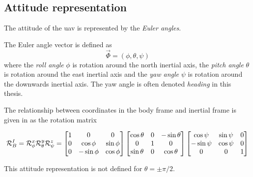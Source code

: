 \subsection{Attitude representation}
The attitude of the \ac{uav} is represented by the \textit{Euler angles}. 

\begin{definition}
The Euler angle vector is defined as
\begin{equation}
    \vec{\Phi}=(\phi, \theta, \psi)
\end{equation}
where the \textit{roll angle} $\phi$ is rotation around the north inertial axis, 
the \textit{pitch angle} $\theta$ is rotation around the east inertial axis and
the \textit{yaw angle} $\psi$ is rotation around the downwards inertial axis. The yaw angle is often 
denoted \textit{heading} in this thesis.

The relationship between coordinates in the body frame and inertial frame is given
in \cite{sensor_fusion} as the rotation matrix 

\begin{equation}\label{eq:r_i_b}
\mathcal{R}^I_B = \mathcal{R}^x_\phi\mathcal{R}^y_\theta\mathcal{R}^z_\psi\\
=
\begin{bmatrix}
    1 & 0 & 0 \\
    0 & \cos\phi & \sin\phi \\
    0 & -\sin\phi & \cos\phi
\end{bmatrix}
\begin{bmatrix}
    \cos\theta & 0 & -\sin\theta \\
    0 & 1 & 0 \\
    \sin\theta & 0 & \cos\theta
\end{bmatrix}      
\begin{bmatrix}
    \cos\psi & \sin\psi & 0 \\
    -\sin\psi & \cos\psi & 0 \\
    0 & 0 & 1
\end{bmatrix}
\end{equation}  
\end{definition}

This attitude representation is not defined for $\theta=\pm\pi/2$.

